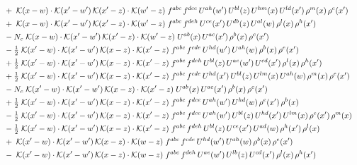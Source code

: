 \documentclass[9pt]{article}
\begin{document}
\begin{align}
&\quad +\;\mathcal{K}(x-w)\cdot\mathcal{K}(x'-w')\,\mathcal{K}(x'-z)\cdot\mathcal{K}(w'-z)\;f^{abc}\,f^{dce}\,U^{ah}(w')\,U^{bl}(z)\,U^{hm}(x)\,U^{ld}(x')\,\rho^{m}(x)\,\rho^{e}(x')\notag\\
&\quad +\;\mathcal{K}(x-w)\cdot\mathcal{K}(x'-w')\,\mathcal{K}(x'-z)\cdot\mathcal{K}(w'-z)\;f^{abc}\,f^{deh}\,U^{ce}(x')\,U^{db}(z)\,U^{al}(w)\,\rho^{l}(x)\,\rho^{h}(x')\notag\\
&\quad -N_c\;\mathcal{K}(x-w)\cdot\mathcal{K}(x'-w')\,\mathcal{K}(x'-z)\cdot\mathcal{K}(w'-z)\;U^{ab}(x)\,U^{ac}(x')\,\rho^{b}(x)\,\rho^{c}(x')\notag\\
&\quad -\tfrac{1}{2}\;\mathcal{K}(x'-w)\cdot\mathcal{K}(x'-w')\,\mathcal{K}(x-z)\cdot\mathcal{K}(x'-z)\;f^{abc}\,f^{cde}\,U^{hd}(w')\,U^{ah}(w)\,\rho^{b}(x)\,\rho^{e}(x')\notag\\
&\quad +\tfrac{1}{2}\;\mathcal{K}(x'-w)\cdot\mathcal{K}(x'-w')\,\mathcal{K}(x-z)\cdot\mathcal{K}(x'-z)\;f^{abc}\,f^{deh}\,U^{bl}(z)\,U^{ae}(w')\,U^{cd}(x')\,\rho^{l}(x)\,\rho^{h}(x')\notag\\
&\quad +\tfrac{1}{2}\;\mathcal{K}(x'-w)\cdot\mathcal{K}(x'-w')\,\mathcal{K}(x-z)\cdot\mathcal{K}(x'-z)\;f^{abc}\,f^{cde}\,U^{hd}(x')\,U^{bl}(z)\,U^{lm}(x)\,U^{ah}(w)\,\rho^{m}(x)\,\rho^{e}(x')\notag\\
&\quad -N_c\;\mathcal{K}(x'-w)\cdot\mathcal{K}(x'-w')\,\mathcal{K}(x-z)\cdot\mathcal{K}(x'-z)\;U^{ab}(x)\,U^{ac}(x')\,\rho^{b}(x)\,\rho^{c}(x')\notag\\
&\quad +\tfrac{1}{2}\;\mathcal{K}(x'-w)\cdot\mathcal{K}(x'-w')\,\mathcal{K}(x-z)\cdot\mathcal{K}(x'-z)\;f^{abc}\,f^{dce}\,U^{ah}(w')\,U^{hd}(w)\,\rho^{e}(x')\,\rho^{b}(x)\notag\\
&\quad -\tfrac{1}{2}\;\mathcal{K}(x'-w)\cdot\mathcal{K}(x'-w')\,\mathcal{K}(x-z)\cdot\mathcal{K}(x'-z)\;f^{abc}\,f^{dce}\,U^{ah}(w')\,U^{bl}(z)\,U^{hd}(x')\,U^{lm}(x)\,\rho^{e}(x')\,\rho^{m}(x)\notag\\
&\quad -\tfrac{1}{2}\;\mathcal{K}(x'-w)\cdot\mathcal{K}(x'-w')\,\mathcal{K}(x-z)\cdot\mathcal{K}(x'-z)\;f^{abc}\,f^{deh}\,U^{bl}(z)\,U^{ce}(x')\,U^{ad}(w)\,\rho^{h}(x')\,\rho^{l}(x)\notag\\
&\quad +\;\mathcal{K}(x'-w)\cdot\mathcal{K}(x'-w')\,\mathcal{K}(x-z)\cdot\mathcal{K}(w-z)\;f^{abc}\,f^{cde}\,U^{hd}(w')\,U^{ah}(w)\,\rho^{b}(x)\,\rho^{e}(x')\notag\\
&\quad -\;\mathcal{K}(x'-w)\cdot\mathcal{K}(x'-w')\,\mathcal{K}(x-z)\cdot\mathcal{K}(w-z)\;f^{abc}\,f^{deh}\,U^{ae}(w')\,U^{lb}(z)\,U^{cd}(x')\,\rho^{l}(x)\,\rho^{h}(x')\notag\\

\end{align}
\end{document}
